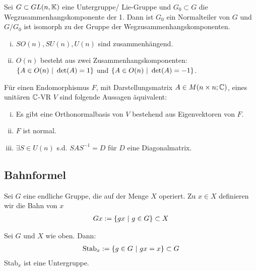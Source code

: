 \begin{satz}
    Sei $G \subset GL(n,\mathbb{K})$ eine Untergruppe/ Lie-Gruppe und $G_0 \subset G$
    die Wegzusammenhangskomponente der 1. Dann ist $G_0$ ein Normalteiler von
    $G$ und $G/G_0$ ist isomorph zu der Gruppe der Wegzusammenhangskomponenten.
\end{satz}

\begin{satz}
    \begin{enumerate}[(i)]
        \item $SO(n), SU(n), U(n)$ sind zusammenhängend.
        \item $O(n)$ besteht aus zwei Zusammenhangskomponenten:
            $\left\{ A \in O(n) \ | \ \det(A) = 1 \right\}$ und
            $\left\{ A \in O(n) \ | \ \det(A) = -1 \right\}$.
    \end{enumerate}
\end{satz}

\begin{theorem}[Spektralsatz]
    Für einen Endomorphismus $F$, mit Darstellungsmatrix $A \in M(n \times n ; \mathbb{C})$,
    eines unitären $\mathbb{C}$-VR $V$ sind folgende Aussagen äquivalent:
    \begin{enumerate}[i)]
        \item Es gibt eine Orthonormalbasis von $V$ bestehend aus Eigenvektoren
        von $F$.
        \item $F$ ist normal.
        \item $\exists S \in U(n)$ s.d. $S A S^{-1} = D$ für $D$ eine Diagonalmatrix.
    \end{enumerate}
\end{theorem}

\subsection{Bahnformel}

\begin{definition}[Bahn]
    Sei $G$ eine endliche Gruppe, die auf der Menge $X$ operiert. Zu $x \in X$
    definieren wir die Bahn von $x$
    \begin{align*}
        G x := \left\{ g x \ | \ g \in G \right\} \subset X
    \end{align*}
\end{definition}

\begin{definition}[Stabilisator]
    Sei $G$ und $X$ wie oben. Dann:
    \begin{align*}
        \text{Stab}_x := \left\{ g \in G \ | \ g x = x \right\} \subset G
    \end{align*}
    Stab$_x$ ist eine Untergruppe.
\end{definition}

